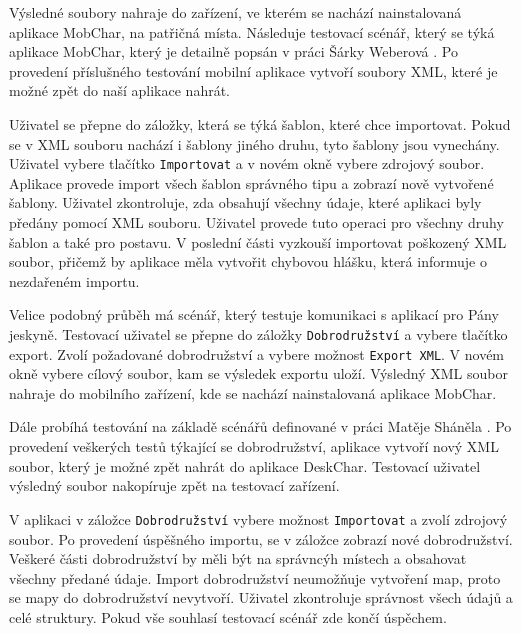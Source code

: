 \documentclass[thesis=B,czech]{resources/FITthesis}[2012/06/26]
\begin{document}
Výsledné soubory nahraje do zařízení, ve kterém se nachází nainstalovaná aplikace MobChar, na patřičná místa. Následuje testovací scénář, který se týká aplikace MobChar, který je detailně popsán v práci Šárky Weberová \cite{Weberova_2017}. Po provedení příslušného testování mobilní aplikace vytvoří soubory XML, které je možné zpět do naší aplikace nahrát. \par

Uživatel se přepne do záložky, která se týká šablon, které chce importovat. Pokud se v XML souboru nachází i šablony jiného druhu, tyto šablony jsou vynechány. Uživatel vybere tlačítko \texttt{Importovat} a v novém okně vybere zdrojový soubor. Aplikace provede import všech šablon správného tipu a zobrazí nově vytvořené šablony. Uživatel zkontroluje, zda obsahují všechny údaje, které aplikaci byly předány pomocí XML souboru. Uživatel provede tuto operaci pro všechny druhy šablon a také pro postavu. V poslední části vyzkouší importovat poškozený XML soubor, přičemž by aplikace měla vytvořit chybovou hlášku, která informuje o nezdařeném importu. \par

Velice podobný průběh má scénář, který testuje komunikaci s aplikací pro Pány jeskyně. Testovací uživatel se přepne do záložky \texttt{Dobrodružství} a vybere tlačítko export. Zvolí požadované dobrodružství a vybere možnost \texttt{Export XML}. V novém okně vybere cílový soubor, kam se výsledek exportu uloží. Výsledný XML soubor nahraje do mobilního zařízení, kde se nachází nainstalovaná aplikace MobChar. \par

Dále probíhá testování na základě scénářů definované v práci Matěje Sháněla \cite{Shanel_2017}. Po provedení veškerých testů týkající se dobrodružství, aplikace vytvoří nový XML soubor, který je možné zpět nahrát do aplikace DeskChar. Testovací uživatel výsledný soubor nakopíruje zpět na testovací zařízení. \par

V aplikaci v záložce \texttt{Dobrodružství} vybere možnost \texttt{Importovat} a zvolí zdrojový soubor. Po provedení úspěšného importu, se v záložce zobrazí nové dobrodružství. Veškeré části dobrodružství by měli být na správncýh místech a obsahovat všechny předané údaje. Import dobrodružství neumožňuje vytvoření map, proto se mapy do dobrodružství nevytvoří. Uživatel zkontroluje správnost všech údajů a celé struktury. Pokud vše souhlasí testovací scénář zde končí úspěchem.
\end{document}
